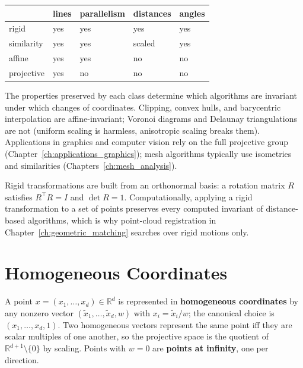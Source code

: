 \begin{center}
\begin{tabular}{lllll}
\toprule
& lines & parallelism & distances & angles \\
\midrule
rigid & yes & yes & yes & yes \\
similarity & yes & yes & scaled & yes \\
affine & yes & yes & no & no \\
projective & yes & no & no & no \\
\bottomrule
\end{tabular}
\end{center}

The properties preserved by each class determine which algorithms are
invariant under which changes of coordinates. Clipping, convex hulls, and
barycentric interpolation are affine-invariant; Voronoi diagrams and Delaunay
triangulations are not (uniform scaling is harmless, anisotropic scaling
breaks them). Applications in graphics and computer vision rely on the full
projective group (Chapter~\ref{ch:applications_graphics}); mesh algorithms
typically use isometries and similarities (Chapters~\ref{ch:mesh_analysis}).

Rigid transformations are built from an orthonormal basis: a rotation matrix
$R$ satisfies $R^\top R = I$ and $\det R = 1$. Computationally, applying a
rigid transformation to a set of points preserves every computed invariant
of distance-based algorithms, which is why point-cloud registration in
Chapter~\ref{ch:geometric_matching} searches over rigid motions only.


\section{Homogeneous Coordinates}
\label{sec:math_homogeneous}

A point $x = (x_1,\dots,x_d) \in \mathbb{R}^d$ is represented in
\textbf{homogeneous coordinates} by any nonzero vector
$(\tilde{x}_1,\dots,\tilde{x}_d, w)$ with $x_i = \tilde{x}_i / w$; the
canonical choice is $(x_1,\dots,x_d,1)$. Two homogeneous vectors represent
the same point iff they are scalar multiples of one another, so the
projective space is the quotient of $\mathbb{R}^{d+1}\setminus\{0\}$ by
scaling. Points with $w=0$ are \textbf{points at infinity}, one per
direction.

